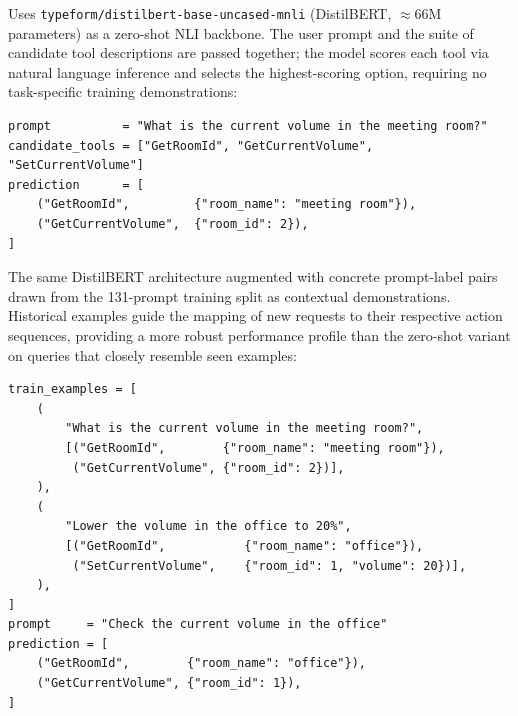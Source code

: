 \documentclass[conference]{IEEEtran}
\begin{document}
\begin{description}[leftmargin=0pt, itemsep=3pt, topsep=4pt]
  \item[\textbf{Small LLM Predictor--Zero-Shot.}]
  Uses \texttt{typeform/distilbert-base-uncased-mnli}
  (DistilBERT, ${\approx}$66M parameters) as a zero-shot NLI backbone.
  The user prompt and the suite of candidate tool descriptions are passed
  together; the model scores each tool via natural language inference and selects
  the highest-scoring option, requiring no task-specific training demonstrations:
\begin{lstlisting}
prompt          = "What is the current volume in the meeting room?"
candidate_tools = ["GetRoomId", "GetCurrentVolume", "SetCurrentVolume"]
prediction      = [
    ("GetRoomId",         {"room_name": "meeting room"}),
    ("GetCurrentVolume",  {"room_id": 2}),
]
\end{lstlisting}

  \item[\textbf{Small LLM Predictor--Few-Shot.}]
  The same DistilBERT architecture augmented with concrete prompt-label pairs
  drawn from the 131-prompt training split as contextual demonstrations.
  Historical examples guide the mapping of new requests to their respective
  action sequences, providing a more robust performance profile than the zero-shot
  variant on queries that closely resemble seen examples:
\begin{lstlisting}
train_examples = [
    (
        "What is the current volume in the meeting room?",
        [("GetRoomId",        {"room_name": "meeting room"}),
         ("GetCurrentVolume", {"room_id": 2})],
    ),
    (
        "Lower the volume in the office to 20%",
        [("GetRoomId",           {"room_name": "office"}),
         ("SetCurrentVolume",    {"room_id": 1, "volume": 20})],
    ),
]
prompt     = "Check the current volume in the office"
prediction = [
    ("GetRoomId",        {"room_name": "office"}),
    ("GetCurrentVolume", {"room_id": 1}),
]
\end{lstlisting}
\end{description}
\end{document}
